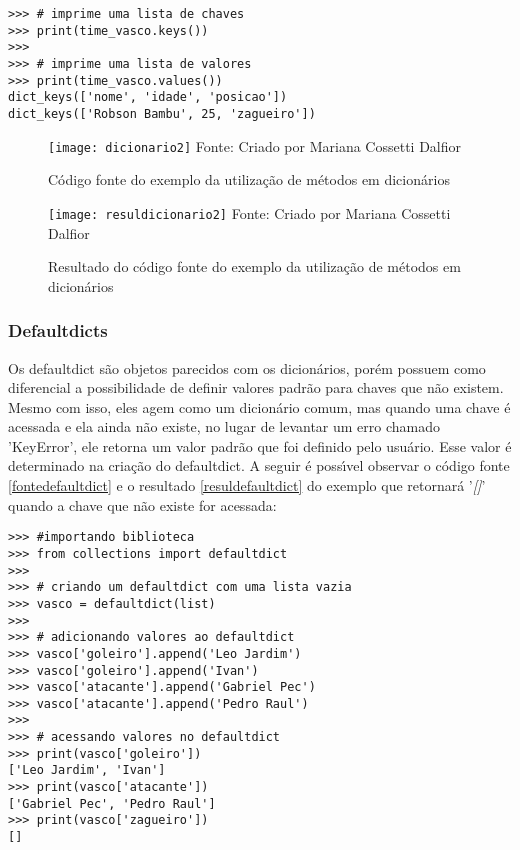 \begin{lstlisting}
>>> # imprime uma lista de chaves
>>> print(time_vasco.keys())
>>> 
>>> # imprime uma lista de valores
>>> print(time_vasco.values()) 
dict_keys(['nome', 'idade', 'posicao'])
dict_keys(['Robson Bambu', 25, 'zagueiro'])
\end{lstlisting}	

\begin{figure}[H]
	\begin{center}
		\caption{C\'{o}digo fonte do exemplo da utiliza\c{c}\~{a}o de m\'{e}todos em dicion\'{a}rios} \label{fontedicionario2}
		\texttt{[image: dicionario2]} 
		\newline
		Fonte: Criado por Mariana Cossetti Dalfior
	\end{center}
\end{figure}

\begin{figure}[H]
	\begin{center}
		\caption{Resultado do c\'{o}digo fonte do exemplo da utiliza\c{c}\~{a}o de m\'{e}todos em dicion\'{a}rios} \label{resuldicionario2}
		\texttt{[image: resuldicionario2]} 
		\newline
		Fonte: Criado por Mariana Cossetti Dalfior
	\end{center}
\end{figure}

\subsubsection{Defaultdicts}
Os defaultdict s\~{a}o objetos parecidos com os dicion\'{a}rios, por\'{e}m possuem como diferencial a possibilidade de definir valores padr\~{a}o para chaves que n\~{a}o existem. Mesmo com isso, eles agem como um dicion\'{a}rio comum, mas quando uma chave \'{e} acessada e ela ainda n\~{a}o existe, no lugar de levantar um erro chamado {'KeyError'}, ele retorna um valor padr\~{a}o que foi definido pelo usu\'{a}rio. Esse valor \'{e} determinado na cria\c{c}\~{a}o do defaultdict. A seguir \'{e} poss\'{\i}vel observar o c\'{o}digo fonte \ref{fontedefaultdict} e o resultado \ref{resuldefaultdict} do exemplo que retornar\'{a} '\textsl{[]}' quando a chave que n\~{a}o existe for acessada:

\begin{lstlisting}
>>> #importando biblioteca
>>> from collections import defaultdict
>>>
>>> # criando um defaultdict com uma lista vazia
>>> vasco = defaultdict(list)
>>> 
>>> # adicionando valores ao defaultdict
>>> vasco['goleiro'].append('Leo Jardim')
>>> vasco['goleiro'].append('Ivan')
>>> vasco['atacante'].append('Gabriel Pec')
>>> vasco['atacante'].append('Pedro Raul')
>>>
>>> # acessando valores no defaultdict
>>> print(vasco['goleiro'])   
['Leo Jardim', 'Ivan']
>>> print(vasco['atacante'])
['Gabriel Pec', 'Pedro Raul']
>>> print(vasco['zagueiro'])
[]
\end{lstlisting}	

